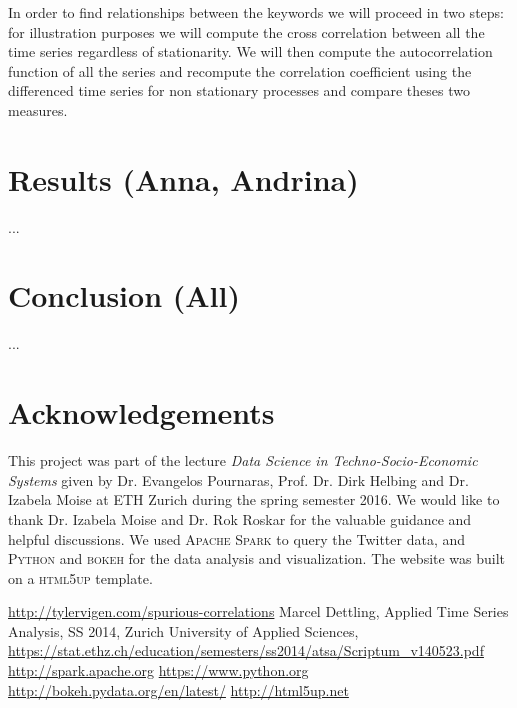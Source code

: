 \documentclass[12pt, a4paper]{article}
\begin{document}
In order to find relationships between the keywords we will proceed in two steps: for illustration purposes we will compute the cross correlation between all the time series regardless of stationarity. We will then compute the autocorrelation function of all the series and recompute the correlation coefficient using the differenced time series for non stationary processes and compare theses two measures.

\section{Results (Anna, Andrina)}
...


\section{Conclusion (All)}
...


\section{Acknowledgements}
This project was part of the lecture \textit{Data Science in Techno-Socio-Economic Systems} given by Dr. Evangelos Pournaras, Prof. Dr. Dirk Helbing and Dr. Izabela Moise at ETH Zurich during the spring semester 2016. We would like to thank Dr. Izabela Moise and Dr. Rok Roskar for the valuable guidance and helpful discussions. We used \textsc{Apache Spark} \cite{spark}  to query the Twitter data, and \textsc{Python} \cite{python} and \textsc{bokeh} \cite{bokeh} for the data analysis and visualization. The website was built on a \textsc{html5up} \cite{html5up} template.

\begin{thebibliography}{9}

\url{http://tylervigen.com/spurious-correlations}
Marcel Dettling, Applied Time Series Analysis, SS 2014, Zurich University of Applied Sciences, 
\url{https://stat.ethz.ch/education/semesters/ss2014/atsa/Scriptum_v140523.pdf}
\url{http://spark.apache.org}
\url{https://www.python.org}
\url{http://bokeh.pydata.org/en/latest/}
\url{http://html5up.net}

\end{thebibliography}
\end{document}
